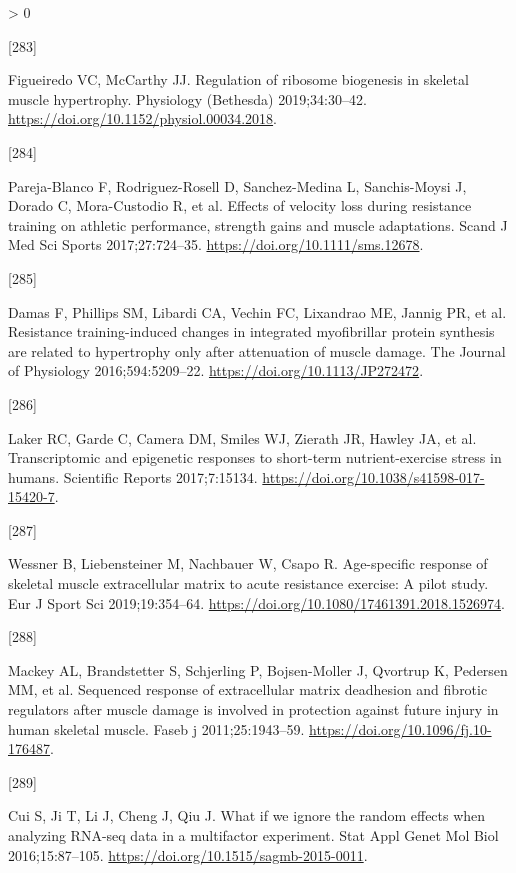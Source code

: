 \documentclass[twoside,10pt]{gihclass} %
\newlength{\cslhangindent}
\newlength{\csllabelwidth}
\newenvironment{CSLReferences}[3] %
 {%
  \setlength{\parindent}{0pt}
  \ifodd #1 \everypar{\setlength{\hangindent}{\cslhangindent}}\ignorespaces\fi
  \ifnum #2 > 0
  \setlength{\parskip}{#2\baselineskip}
  \fi
 }%
 {}
\newcommand{\CSLLeftMargin}[1]{\parbox[t]{\maxof{\widthof{#1}}{\csllabelwidth}}{#1}}
\newcommand{\CSLRightInline}[1]{\parbox[t]{\linewidth}{#1}}
\begin{document}
\begin{CSLReferences}{0}{0}
\leavevmode\hypertarget{ref-RN2142}{}%
\CSLLeftMargin{{[}283{]} }
\CSLRightInline{Figueiredo VC, McCarthy JJ. Regulation of ribosome biogenesis in skeletal muscle hypertrophy. Physiology (Bethesda) 2019;34:30--42. \url{https://doi.org/10.1152/physiol.00034.2018}.}

\leavevmode\hypertarget{ref-RN2217}{}%
\CSLLeftMargin{{[}284{]} }
\CSLRightInline{Pareja-Blanco F, Rodriguez-Rosell D, Sanchez-Medina L, Sanchis-Moysi J, Dorado C, Mora-Custodio R, et al. Effects of velocity loss during resistance training on athletic performance, strength gains and muscle adaptations. Scand J Med Sci Sports 2017;27:724--35. \url{https://doi.org/10.1111/sms.12678}.}

\leavevmode\hypertarget{ref-RN2144}{}%
\CSLLeftMargin{{[}285{]} }
\CSLRightInline{Damas F, Phillips SM, Libardi CA, Vechin FC, Lixandrao ME, Jannig PR, et al. Resistance training-induced changes in integrated myofibrillar protein synthesis are related to hypertrophy only after attenuation of muscle damage. The Journal of Physiology 2016;594:5209--22. \url{https://doi.org/10.1113/JP272472}.}

\leavevmode\hypertarget{ref-RN2401}{}%
\CSLLeftMargin{{[}286{]} }
\CSLRightInline{Laker RC, Garde C, Camera DM, Smiles WJ, Zierath JR, Hawley JA, et al. Transcriptomic and epigenetic responses to short-term nutrient-exercise stress in humans. Scientific Reports 2017;7:15134. \url{https://doi.org/10.1038/s41598-017-15420-7}.}

\leavevmode\hypertarget{ref-RN2451}{}%
\CSLLeftMargin{{[}287{]} }
\CSLRightInline{Wessner B, Liebensteiner M, Nachbauer W, Csapo R. Age-specific response of skeletal muscle extracellular matrix to acute resistance exercise: A pilot study. Eur J Sport Sci 2019;19:354--64. \url{https://doi.org/10.1080/17461391.2018.1526974}.}

\leavevmode\hypertarget{ref-RN2453}{}%
\CSLLeftMargin{{[}288{]} }
\CSLRightInline{Mackey AL, Brandstetter S, Schjerling P, Bojsen-Moller J, Qvortrup K, Pedersen MM, et al. Sequenced response of extracellular matrix deadhesion and fibrotic regulators after muscle damage is involved in protection against future injury in human skeletal muscle. Faseb j 2011;25:1943--59. \url{https://doi.org/10.1096/fj.10-176487}.}

\leavevmode\hypertarget{ref-RN2366}{}%
\CSLLeftMargin{{[}289{]} }
\CSLRightInline{Cui S, Ji T, Li J, Cheng J, Qiu J. What if we ignore the random effects when analyzing RNA-seq data in a multifactor experiment. Stat Appl Genet Mol Biol 2016;15:87--105. \url{https://doi.org/10.1515/sagmb-2015-0011}.}


\end{CSLReferences}
\end{document}
